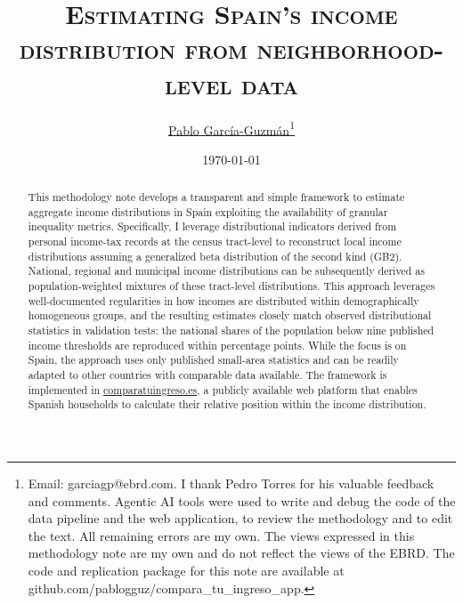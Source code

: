 \documentclass[letterpaper,11pt,leqno]{article}
\begin{document}
\title{\Large \textsc{Estimating Spain's income distribution from neighborhood-level data}}

\author{\href{https://pablogguz.github.io/}{\large{Pablo García-Guzmán}\thanks{Email: \href{mailto:garciagp@ebrd.com}{garciagp@ebrd.com}. I thank Pedro Torres for his valuable feedback and comments. Agentic AI tools were used to write and debug the code of the data pipeline and the web application, to review the methodology and to edit the text. All remaining errors are my own. The views expressed in this methodology note are my own and do not reflect the views of the EBRD. The code and replication package for this note are available at \href{https://github.com/pablogguz/compara_tu_ingreso_app}{github.com/pablogguz/compara\_tu\_ingreso\_app}.}} \\ \normalsize{}}

\date{\normalsize \today \\}

\maketitle
\begin{abstract}
\onehalfspacing
This methodology note develops a transparent and simple framework to estimate aggregate income distributions in Spain exploiting the availability of granular inequality metrics. Specifically, I leverage distributional indicators derived from personal income-tax records at the census tract-level to reconstruct local income distributions assuming a generalized beta distribution of the second kind (GB2). National, regional and municipal income distributions can be subsequently derived as population-weighted mixtures of these tract-level distributions. This approach leverages well-documented regularities in how incomes are distributed within demographically homogeneous groups, and the resulting estimates closely match observed distributional statistics in validation tests: the national shares of the population below nine published income thresholds are reproduced within \ThrAllMaxDiff{} percentage points. While the focus is on Spain, the approach uses only published small-area statistics and can be readily adapted to other countries with comparable data available. The framework is implemented in \href{https://comparatuingreso.es/}{\mbox{comparatuingreso.es}}, a publicly available web platform that enables Spanish households to calculate their relative position within the income distribution.
\end{abstract}
\end{document}
